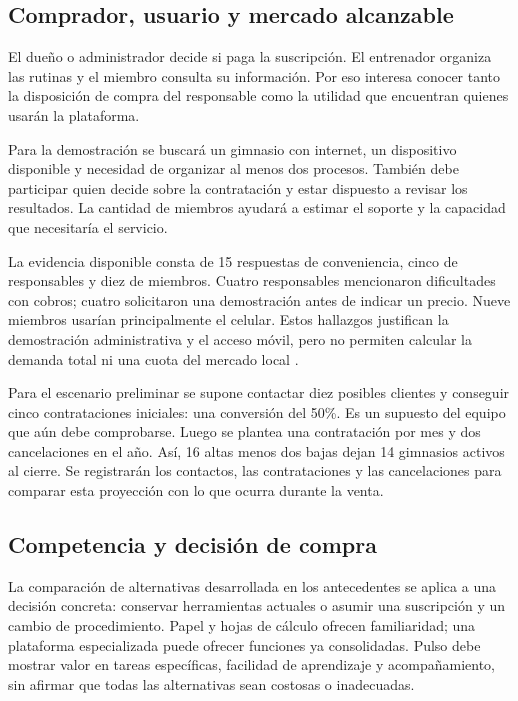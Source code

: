 \subsection{Comprador, usuario y mercado alcanzable}

El dueño o administrador decide si paga la suscripción. El entrenador organiza
las rutinas y el miembro consulta su información. Por eso interesa conocer
tanto la disposición de compra del responsable como la utilidad que encuentran
quienes usarán la plataforma.

Para la demostración se buscará un gimnasio con internet, un dispositivo
disponible y necesidad de organizar al menos dos procesos. También debe
participar quien decide sobre la contratación y estar dispuesto a revisar los
resultados. La cantidad de miembros ayudará a estimar el soporte y la capacidad
que necesitaría el servicio.

La evidencia disponible consta de 15 respuestas de conveniencia, cinco de
responsables y diez de miembros. Cuatro responsables mencionaron dificultades
con cobros; cuatro solicitaron una demostración antes de indicar un precio.
Nueve miembros usarían principalmente el celular. Estos hallazgos justifican
la demostración administrativa y el acceso móvil, pero no permiten calcular la
demanda total ni una cuota del mercado local
\parencite{encuesta_gymhub_2026}.

Para el escenario preliminar se supone contactar diez posibles clientes y
conseguir cinco contrataciones iniciales: una conversión del 50\%. Es un
supuesto del equipo que aún debe comprobarse. Luego se plantea una contratación
por mes y dos cancelaciones en el año. Así, 16 altas menos dos bajas dejan
14 gimnasios activos al cierre. Se registrarán los contactos, las
contrataciones y las cancelaciones para comparar esta proyección con lo que
ocurra durante la venta.

\subsection{Competencia y decisión de compra}

La comparación de alternativas desarrollada en los antecedentes se aplica a una
decisión concreta: conservar herramientas actuales o asumir una suscripción y un
cambio de procedimiento. Papel y hojas de cálculo ofrecen familiaridad; una
plataforma especializada puede ofrecer funciones ya consolidadas. Pulso debe
mostrar valor en tareas específicas, facilidad de aprendizaje y acompañamiento,
sin afirmar que todas las alternativas sean costosas o inadecuadas.

